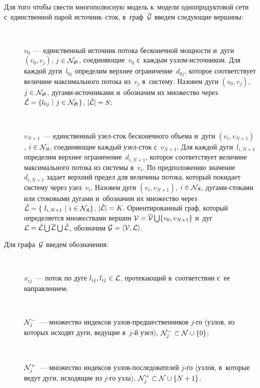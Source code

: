 \begin{multicols}{2}
Для того чтобы свести многополюсную модель к~модели однопродуктовой 
сети с~единственной парой ис\-точ\-ник--сток, в~граф~$\overline {\cal G}$ введем следующие вершины:
\begin{description}
\item[\,] $v_0$~---  единственный источник потока бесконечной мощности  
и~дуги $(v_0, v_j)$,  $j \hm\in {\cal N}_\SS$, 
соединяющие~$v_0$ с~каж\-дым уз\-лом-ис\-точ\-ником. 
Для каждой дуги~$l_{0j}$ определим верхнее ограничение~$d_{0j}$, которое 
соответствует величине максимального потока из~$v_j$ в~систему. 
Назовем  дуги $(v_0, v_j)$, 
$j \hm\in {\cal N}_\SS$, ду\-га\-ми-ис\-точ\-ни\-ка\-ми 
и~обозначим их множество через
$\hat{{\cal L}}\hm=\{l_{0 j} \ | \  j \in {\cal N}_\SS \}$, $| \hat{{\cal L}}| \hm=  S; $\\[-13pt]
\item[\,] 
$v_{N+1}$~---  единственный узел-сток бесконечного объема  
и~дуги $(v_i, v_{N+1})$,  
$i \hm\in {\cal N}_\SK$, соединяющие каждый узел-сток 
с~$v_{N+1}$.  Для каж\-дой дуги~$l_{i,N+1}$ определим верхнее ограничение~$d_{i,N+1}$, 
которое соответствует величине максимального потока из системы в~$v_i$. 
По предположению значение~$d_{i,N+1}$ задает верхний предел для величины потока, 
который покидает систему через узел~$v_i$.
Назовем  дуги $(v_i, v_{N+1})$, $i \hm\in {\cal N}_\SK$,  
ду\-га\-ми-сто\-ка\-ми или стоковыми дугами и~обозначим их множество через
$\tilde{{\cal L}}\hm=\{\ l_{i,N + 1} \ | \ i  \hm\in {\cal N}_\SK\}$, 
$|\tilde{{\cal L}}|\hm =  K.$
Ориентированный граф, который определяется множествами вершин 
${\cal V} \hm= \overline {\cal V} \bigcup \{v_0, v_{N+1}\}$ и~дуг 
${\cal L} \hm= \tilde{{\cal L}} \bigcup \overline {{\cal L}} \bigcup \hat {\cal L}$, обозначим 
${\cal G} \hm= \langle {{\cal V}}, {{\cal L}} \rangle $.
\end{description}

Для графа~${\cal G}$ введем обозначения:
\begin{description}
\item[\,] $x_{ij}$~--- поток по дуге $l_{ij}, l_{ij}\hm\in {{\cal L}}$, протекающий 
в~соответствии с~ее направлением;\\[-13pt]
\item[\,] ${\cal N}^{-}_j$~--- множество индексов уз\-лов-пред\-шест\-вен\-ни\-ков $j$-го 
(узлов, из которых исходят дуги, ведущие в~$j$-й узел), 
${\cal N}^{-}_j \hm\subset {\cal N} \cup \{0\} $;\\[-13pt]
\item[\,] ${\cal N}^{+}_j$~--- множество индексов уз\-лов-по\-сле\-до\-ва\-те\-лей $j$-го 
(узлов, в~которые ведут дуги, исходящие из $j$-го узла), 
${\cal N}^{+}_j \hm\subset {\cal N} \cup \{N+1\}$.
\end{description}


\end{multicols}
